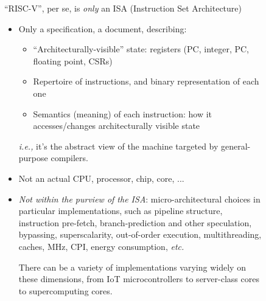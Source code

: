 \documentclass{article}
\newcommand{\ie}{\emph{i.e.,}}
\newcommand{\etc}{\emph{etc.}}
\begin{document}
\begin{figure}[htp]
    \centering
    {\Huge ``RISC-V'', per se, is \emph{only} an ISA (Instruction Set Architecture)}

    \vspace{0.5in}

    \begin{minipage}{9in}\LARGE
      \begin{itemize}
      \item Only a specification, a document, describing:
        \begin{itemize}
        \item ``Architecturally-visible'' state: registers (PC, integer, PC, floating point, CSRs)
        \item Repertoire of instructions, and binary representation of each one
        \item Semantics (meaning) of each instruction: how it
          accesses/changes architecturally visible state
        \end{itemize}
        {\ie} it's the abstract view of the machine targeted by general-purpose compilers.

      \item Not an actual CPU, processor, chip, core, ...

      \item \emph{Not within the purview of the ISA}:
        micro-architectural choices in particular implementations,
        such as pipeline structure, instruction pre-fetch,
        branch-prediction and other speculation, bypassing,
        superscalarity, out-of-order execution, multithreading,
        caches, MHz, CPI, energy consumption, {\etc}

        There can be a variety of implementations varying widely on
        these dimensions, from IoT microcontrollers to server-class
        cores to supercomputing cores.

      \end{itemize}
    \end{minipage}
\end{figure}

\clearpage

\end{document}
